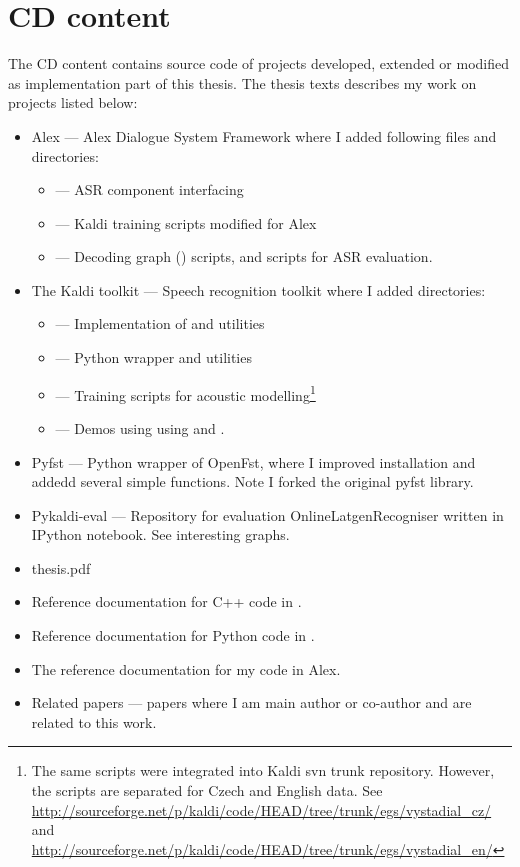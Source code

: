 \chapter{CD content}
\label{cha:cd_content}
The CD content contains source code of projects developed, extended or modified as implementation part of this thesis.
The thesis texts describes my work on projects listed below:

\begin{itemize}
    \item Alex --- Alex Dialogue System Framework where I added following files and directories:
        \begin{itemize}
            \item {} --- ASR component interfacing 
            \item {} --- Kaldi training scripts modified for Alex 
            \item {} --- Decoding graph () scripts, and scripts for \acs{ASR} evaluation.
        \end{itemize}
    \item The Kaldi toolkit --- Speech recognition toolkit where I added directories:
        \begin{itemize}
            \item {} --- Implementation of  and utilities 
            \item {} --- Python wrapper  and utilities
            \item {} --- Training scripts for acoustic modelling\footnote{The same scripts were integrated into Kaldi svn trunk repository. However, the scripts are separated for Czech and English data. See \url{http://sourceforge.net/p/kaldi/code/HEAD/tree/trunk/egs/vystadial_cz/} and \url{http://sourceforge.net/p/kaldi/code/HEAD/tree/trunk/egs/vystadial_en/}}
            \item {} --- Demos using using  and .
        \end{itemize} 
    \item Pyfst --- Python wrapper of OpenFst, where I improved installation and addedd several simple functions. Note I forked the original pyfst library.
    \item Pykaldi-eval --- Repository for evaluation OnlineLatgenRecogniser written in IPython notebook. See interesting graphs.
    \item thesis.pdf
    \item Reference documentation for C++ code in .
    \item Reference documentation for Python code in .
    \item The reference documentation for my code in Alex.
    \item Related papers --- papers where I am main author or co-author and are related to this work.
\end{itemize}
